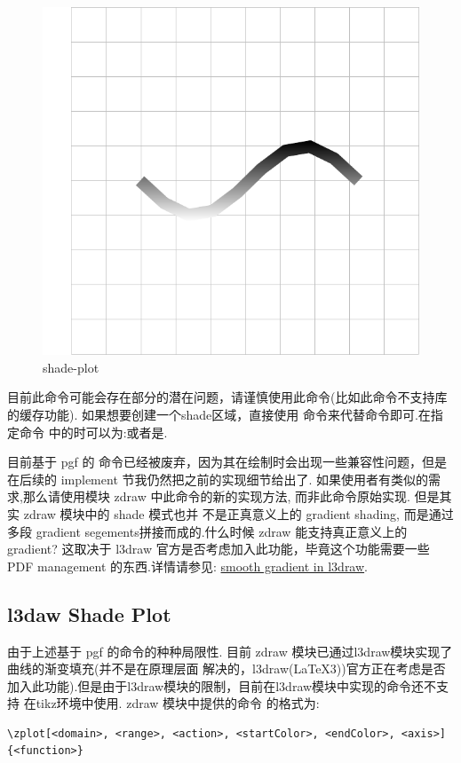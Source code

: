 \begin{figure}[!htb]
    \centering
    \includegraphics[width=.75\linewidth]{./pics/ztikz_example_5.pdf}
    \caption{shade-plot}
    \label{fig:shade-plot}
\end{figure}

目前此命令可能会存在部分的潜在问题，请谨慎使用此命令(比如此命令不支持库的缓存功能). 
如果想要创建一个shade区域，直接使用 \cmd{\shade}命令来代替\cmd{\fill}命令即可.在指定命令
中的时可以为:或者是.

\begin{remark}
目前基于 pgf 的 \cmd{\shadeplot} 命令已经被废弃，因为其在绘制时会出现一些兼容性问题，但是在后续的 implement 节我仍然把之前的实现细节给出了.
如果使用者有类似的需求,那么请使用模块 zdraw 中此命令的新的实现方法\cmd{\zplot}, 而非此命令原始实现. 但是其实 zdraw 模块中的 shade 模式也并
不是正真意义上的 gradient shading, 而是通过多段 gradient segements拼接而成的.什么时候 zdraw 能支持真正意义上的 gradient? 这取决于 l3draw 
官方是否考虑加入此功能，毕竟这个功能需要一些  PDF management 的东西.详情请参见: \href{https://tex.stackexchange.com/q/719488/294585}{smooth gradient in l3draw}. 
\end{remark}

\subsection{l3daw Shade Plot}\label{subsec:l3-zplot}
由于上述基于 pgf 的\cmd{\shadeplot}命令的种种局限性. 目前 zdraw 模块已通过l3draw模块实现了曲线的渐变填充(并不是在原理层面
解决的，l3draw(\LaTeX{}3))官方正在考虑是否加入此功能).但是由于l3draw模块的限制，目前在l3draw模块中实现的命令还不支持
在tikz环境中使用. zdraw 模块中提供的命令 \cmd{\zplot} 的格式为:
\begin{verbatim}
\zplot[<domain>, <range>, <action>, <startColor>, <endColor>, <axis>]{<function>}
\end{verbatim}

